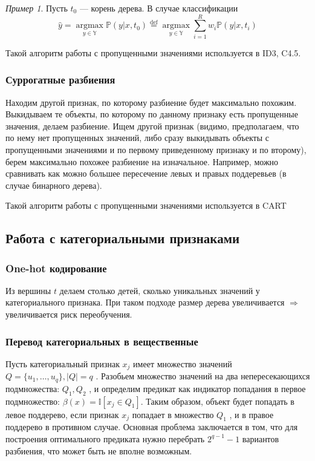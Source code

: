 \documentclass[a4paper, 12pt]{article}
\theoremstyle{plain} %
\theoremstyle{definition} %
\theoremstyle{remark} %
\newtheorem{example}{Пример}
\begin{document}
\begin{example}
Пусть $ t_0 $
— корень дерева.
В случае классификации
\[
\hat{y} = \underset{y \in \mathbb{Y}}{\operatorname{argmax}}  \mathbb{P}(y|x, t_0) \overset{\mbox{def}}{=} \underset{y \in \mathbb{Y}}{\operatorname{argmax}} \sum_{i = 1}^R w_{i}\mathbb{P}(y|x, t_i)
\]


Такой алгоритм работы с пропущенными значениями используется в ID3, C4.5.

\subsubsection{Суррогатные разбиения}

Находим другой признак, по которому разбиение будет максимально похожим.
Выкидываем те объекты, по которому по данному признаку есть пропущенные значения, делаем разбиение. Ищем другой признак (видимо, предполагаем, что по нему нет пропущенных значений, либо сразу выкидывать объекты с пропущенными значениями и по первому приведенному признаку и по второму), берем максимально похожее разбиение на изначальное. Например, можно сравнивать как можно большее пересечение левых и правых поддеревьев (в случае бинарного дерева).

Такой алгоритм работы с пропущенными значениями используется в CART

\subsection{Работа с категориальными признаками}

\subsubsection{One-hot кодирование}

Из вершины $ t $
делаем столько детей, сколько уникальных значений у категориального признака.
При таком подходе размер дерева увеличивается $ \Rightarrow $
увеличивается риск переобучения.

\subsubsection{Перевод категориальных в вещественные}

Пусть категориальный признак $ x_j $
имеет
множество значений $ Q = \{u_1, \dots, u_q\}, |Q| = q $
. Разобьем множество значений на два непересекающихся подмножества: $ Q_1, Q_2 $
, и определим предикат как индикатор
попадания в первое подмножество: $ \beta(x) = \mathbb{I}[x_j \in Q_1 ]$. Таким образом, объект будет попадать в левое поддерево, если признак $ x_j $ попадает в множество $ Q_1 $ , и в правое поддерево в противном случае. Основная проблема заключается в том, что для построения оптимального предиката нужно перебрать $ 2^{q-1} - 1 $
вариантов разбиения, что может быть не вполне возможным.


\end{example}
\end{document}
